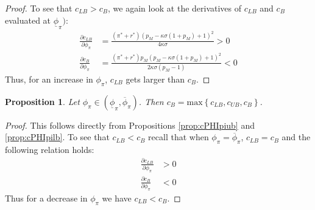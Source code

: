 \documentclass[11pt]{article}
\newtheorem{proposition}{Proposition}
\begin{document}
\begin{singlespace}
\begin{proof}
			To see that $c_{LB} > c_{B}$, we again look at the derivatives of $c_{LB}$ and $c_{B}$ evaluated at $\underline{\phi}_{\pi})$:
			\begin{align*}
			\frac{\partial c_{LB}}{\partial \phi_{\pi}} &= \frac{(\pi^* + r^*)(p_M-\kappa\sigma(1+p_M)+1)^2}{4\kappa\sigma} > 0\\
			\frac{\partial c_{B}}{\partial \phi_{\pi}} &= \frac{(\pi^* + r^*)p_M(p_M-\kappa\sigma(1+p_M)+1)^2}{2\kappa\sigma(p_M -1)} < 0
			\end{align*}
			Thus, for an increase in  $\phi_{\pi}$, $c_{LB}$ gets larger than $c_{B}$. 
		\end{proof}
		\begin{proposition}\label{prop:cPHIpilbcPHIpiub}
			Let $\phi_{\pi}\in(\underline{\phi}_{\pi},\overline{\phi}_{\pi})$. Then $c_{B} = \text{max}\left\{c_{LB}, c_{UB}, c_{B}\right\}$. 
		\end{proposition}
		\begin{proof}
			This follows directly from Propositions \ref{prop:cPHIpiub} and \ref{prop:cPHIpilb}. 
			To see that $c_{LB} < c_{B}$ recall that when $\phi_{\pi} = \overline{\phi}_{\pi}$,  $c_{LB} = c_{B}$ and the following relation holds:
			\begin{align*}
			\frac{\partial c_{LB}}{\partial \phi_{\pi}} &> 0\\
			\frac{\partial c_{B}}{\partial \phi_{\pi}} & < 0
			\end{align*}
			Thus for a decrease in $\phi_{\pi}$ we have $c_{LB} < c_{B}$. 
			

\end{proof}
\end{singlespace}
\end{document}
